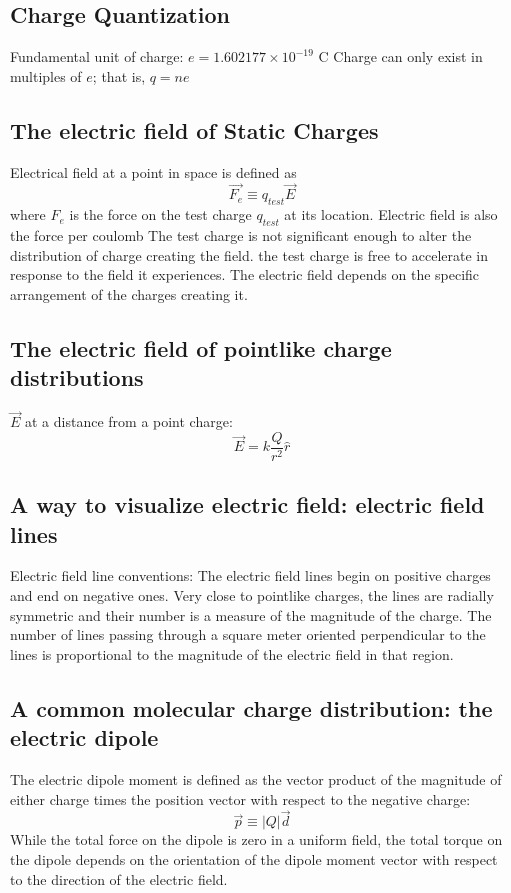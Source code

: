 \documentclass[twocolumn]{article}
\begin{document}
\subsection{Charge Quantization}
\begin{outline}
	\1 Fundamental unit of charge: \(e=1.602177\times10^{-19}\text{ C}\)
	\1 Charge can only exist in multiples of $e$; that is, \(q=ne\)

\end{outline}
\subsection{The electric field of Static Charges}
\begin{outline}
	\1 Electrical field at a point in space is defined as \[\vec{F_e}\equiv q_{test}\vec{E}\] where $F_e$ is the force on the test charge $q_{test}$ at its location. 
	\1 Electric field is also the force per coulomb
	\1 The test charge is not significant enough to alter the distribution of charge creating the field. 
	\1 the test charge is free to accelerate in response to the field it experiences. 
	\1 The electric field depends on the specific arrangement of the charges creating it. 
\end{outline}
\subsection{The electric field of pointlike charge distributions}
\begin{outline}
	\1 $\vec{E}$ at a distance from a point charge: \[\vec{E}=k\dfrac{Q}{r^2}\hat r\]
\end{outline}
\subsection{A way to visualize electric field: electric field lines}
\begin{outline}
	\1 Electric field line conventions: 
		\2 The electric field lines begin on positive charges and end on negative ones.
		\2 Very close to pointlike charges, the lines are radially symmetric and their number is a measure of the magnitude of the charge. 
		\2 The number of lines passing through a square meter oriented perpendicular to the lines is proportional to the magnitude of the electric field in that region. 
	
\end{outline}
\subsection{A common molecular charge distribution: the electric dipole}
\begin{outline}
	\1 The electric dipole moment is defined as the vector product of the magnitude of either charge times the position vector with respect to the negative charge: \[\vec{p}\equiv|Q|\vec{d}\]
	\1 While the total force on the dipole is zero in a uniform field, the total torque on the dipole depends on the orientation of the dipole moment vector with respect to the direction of the electric field. 

\end{outline}
\end{document}
